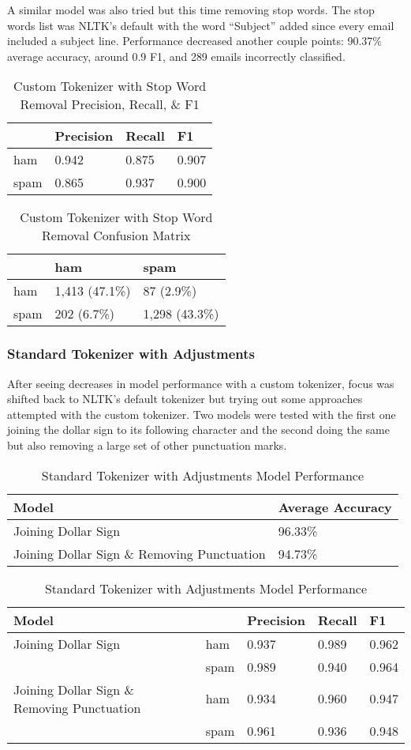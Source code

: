 \documentclass[a4paper]{article}
\begin{document}
	A similar model was also tried but this time removing stop words. The stop words list was NLTK’s default with the word “Subject” added since every email included a subject line. Performance decreased another couple points: 90.37\% average accuracy, around 0.9 F1, and 289 emails incorrectly classified.
	
	\begin{table}[H]
	\centering
	\caption{Custom Tokenizer with Stop Word Removal Precision, Recall, \& F1}
	\begin{tabular}{l|lll}
		& Precision & Recall & F1 \\
		\hline
		ham & 0.942 & 0.875 & 0.907 \\
		spam & 0.865 & 0.937 & 0.900
	\end{tabular}
	\end{table}

	\begin{table}[H]
		\centering
		\caption{Custom Tokenizer with Stop Word Removal Confusion Matrix}
		\begin{tabular}{l|ll}
			& ham & spam \\
			\hline
			ham & 1,413 (47.1\%) & 87 (2.9\%) \\
			spam & 202 (6.7\%) & 1,298 (43.3\%)
		\end{tabular}
	\end{table}

	\subsubsection{Standard Tokenizer with Adjustments}
	
	After seeing decreases in model performance with a custom tokenizer, focus was shifted back to NLTK’s default tokenizer but trying out some approaches attempted with the custom tokenizer. Two models were tested with the first one joining the dollar sign to its following character and the second doing the same but also removing a large set of other punctuation marks.
	
	\begin{table}[H]
		\centering
		\caption{Standard Tokenizer with Adjustments Model Performance}
		\begin{tabular}{ll}
			Model & Average Accuracy \\
			\hline
			Joining Dollar Sign & 96.33\% \\
			Joining Dollar Sign \& Removing Punctuation & 94.73\%
		\end{tabular}
		\begin{tabular}{l|llll}
		\hline
		\hline
			Model & & Precision & Recall & F1 \\
			\hline
			Joining Dollar Sign & ham  & 0.937 & 0.989 & 0.962 \\
							    & spam & 0.989 & 0.940 & 0.964 \\
			\hline
			Joining Dollar Sign \& Removing Punctuation & ham  & 0.934 & 0.960 & 0.947 \\
														& spam & 0.961 & 0.936 & 0.948
		\end{tabular}
	\end{table}
	
\end{document}
